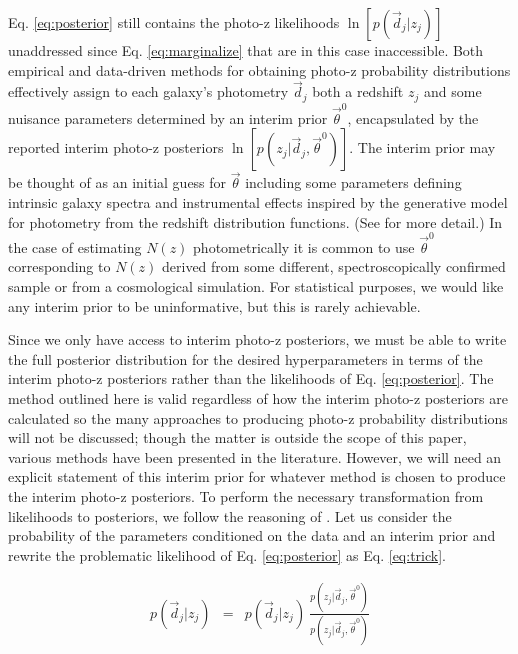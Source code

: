 \documentclass[preprint]{aastex}
\begin{document}
Eq. \ref{eq:posterior} still contains the photo-z likelihoods 
$\ln[p(\vec{d}_{j}|z_{j})]$ unaddressed since Eq. \ref{eq:marginalize} that are 
in this case inaccessible.  Both empirical and data-driven methods for 
obtaining photo-z probability distributions effectively assign to each galaxy's 
photometry $\vec{d}_{j}$ both a redshift $z_{j}$ and some nuisance parameters 
determined by an interim prior $\vec{\theta}^{0}$, encapsulated by the reported 
interim photo-z posteriors $\ln[p(z_{j}|\vec{d}_{j},\vec{\theta}^{0})]$.  The 
interim prior may be thought of as an initial guess for $\vec{\theta}$ 
including some parameters defining intrinsic galaxy spectra and instrumental 
effects inspired by the generative model for photometry from the redshift 
distribution functions. (See \citet{Benitez2000} for more detail.)  In the case 
of estimating $N(z)$ photometrically it is common to use $\vec{\theta}^{0}$ 
corresponding to $N(z)$ derived from some different, spectroscopically 
confirmed sample or from a cosmological simulation.  For statistical purposes, 
we would like any interim prior to be uninformative, but this is rarely 
achievable.  

Since we only have access to interim photo-z posteriors, we must be able to 
write the full posterior distribution for the desired hyperparameters in terms 
of the interim photo-z posteriors rather than the likelihoods of Eq. 
\ref{eq:posterior}.  The method outlined here is valid regardless of how the 
interim photo-z posteriors are calculated so the many approaches to producing 
photo-z probability distributions will not be discussed; though the matter is 
outside the scope of this paper, various methods have been presented in the 
literature. \citep{Sheldon2012, Ball2008, CarrascoKind2013, CarrascoKind2014a}  
However, we will need an explicit statement of this interim prior for whatever 
method is chosen to produce the interim photo-z posteriors.  To perform the 
necessary transformation from likelihoods to posteriors, we follow the 
reasoning of \citet{Marshall2015}.  Let us consider the probability of the 
parameters conditioned on the data and an interim prior and rewrite the 
problematic likelihood of Eq. \ref{eq:posterior} as Eq. \ref{eq:trick}.  

\begin{eqnarray}
\label{eq:trick}
p(\vec{d}_{j}|z_{j}) &=& p(\vec{d}_{j}|z_{j})\ 
\frac{p(z_{j}|\vec{d}_{j},\vec{\theta}^{0})}{p(z_{j}|\vec{d}_{j},\vec{\theta}^{0
})}
\end{eqnarray}
\end{document}
